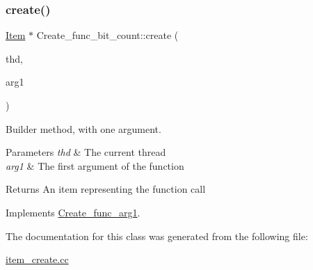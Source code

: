 \subsubsection{\texorpdfstring{create()}{create()}}
{\footnotesize\ttfamily \mbox{\hyperlink{classItem}{Item}} $\ast$ Create\+\_\+func\+\_\+bit\+\_\+count\+::create (\begin{DoxyParamCaption}\item[{T\+HD $\ast$}]{thd,  }\item[{\mbox{\hyperlink{classItem}{Item}} $\ast$}]{arg1 }\end{DoxyParamCaption})\hspace{0.3cm}{\ttfamily [virtual]}}

Builder method, with one argument. 
\begin{DoxyParams}{Parameters}
{\em thd} & The current thread \\
\hline
{\em arg1} & The first argument of the function \\
\hline
\end{DoxyParams}
\begin{DoxyReturn}{Returns}
An item representing the function call 
\end{DoxyReturn}


Implements \mbox{\hyperlink{classCreate__func__arg1_a3e9a98f755cd82c3e762e334c955a8c9}{Create\+\_\+func\+\_\+arg1}}.



The documentation for this class was generated from the following file\+:\begin{DoxyCompactItemize}
\item 
\mbox{\hyperlink{item__create_8cc}{item\+\_\+create.\+cc}}\end{DoxyCompactItemize}
